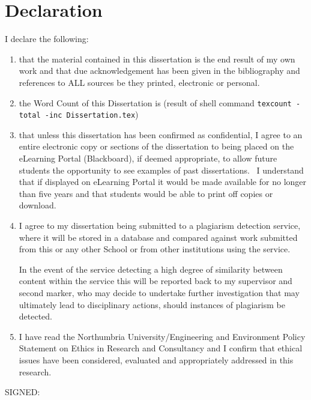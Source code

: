 \chapter{Declaration}

I declare the following:

\begin{enumerate}

\item that the material contained in this dissertation is the end result of my own work and that due acknowledgement has been given in the bibliography and references to ALL sources be they printed, electronic or personal.

\item the Word Count of this Dissertation is 
 (result of shell command \texttt{texcount -total -inc Dissertation.tex})

\item that unless this dissertation has been confirmed as confidential, I agree to an entire electronic copy or sections of the dissertation to being placed on the eLearning Portal (Blackboard), if deemed appropriate, to allow future students the opportunity to see examples of past dissertations.  I understand that if displayed on eLearning Portal it would be made available for no longer than five years and that students would be able to print off copies or download. 

\item I agree to my dissertation being submitted to a plagiarism detection service, where it will be stored in a database and compared against work submitted from this or any other School or from other institutions using the service. 

In the event of the service detecting a high degree of similarity between content within the service this will be reported back to my supervisor and second marker, who may decide to undertake further investigation that may ultimately lead to disciplinary actions, should instances of plagiarism be detected.

\item I have read the Northumbria University/Engineering and Environment Policy Statement on Ethics in Research and Consultancy and I confirm that ethical issues have been considered, evaluated and appropriately addressed in this research.
\end{enumerate}
\vspace{1in}
\large{SIGNED:\dotfill}
